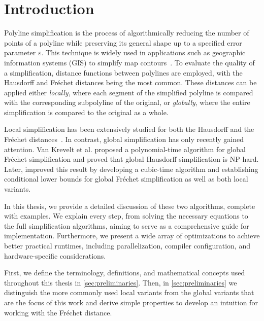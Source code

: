 \section{Introduction}
\label{sec:introduction}

Polyline simplification is the process of algorithmically reducing the number of points of a polyline while preserving its general shape up to a specified error parameter \(\varepsilon\). This technique is widely used in applications such as geographic information systems (GIS) to simplify map contours~\cite{algorithms_reduction_number_points_caricature}. To evaluate the quality of a simplification, distance functions between polylines are employed, with the Hausdorff and Fréchet distances being the most common. These distances can be applied either \emph{locally}, where each segment of the simplified polyline is compared with the corresponding subpolyline of the original, or \emph{globally}, where the entire simplification is compared to the original as a whole.

Local simplification has been extensively studied for both the Hausdorff and the Fréchet distances~\cite{polyline_simplification_under_the_local_frechet_distance_has_almost_quadratic_runtime_in_2d_storandtetal,computational_geometric_methods_for_polygonal_approximations_of_a_curve}. In contrast, global simplification has only recently gained attention. Van Krevelt et al. proposed a polynomial-time algorithm for global Fréchet simplification and proved that global Hausdorff simplification is NP-hard. Later, \citeauthor{polyline_simplification_has_cubic_complexity_bringmannetal} improved this result by developing a cubic-time algorithm and establishing conditional lower bounds for global Fréchet simplification as well as both local variants.

In this thesis, we provide a detailed discussion of these two algorithms, complete with examples. We explain every step, from solving the necessary equations to the full simplification algorithms, aiming to serve as a comprehensive guide for implementation. Furthermore, we present a wide array of optimizations to achieve better practical runtimes, including parallelization, compiler configuration, and hardware-specific considerations.

First, we define the terminology, definitions, and mathematical concepts used throughout this thesis in \cref{sec:preliminaries}. Then, in \cref{sec:preliminaries} we distinguish the more commonly used local variants from the global variants that are the focus of this work and derive simple properties to develop an intuition for working with the Fréchet distance.

